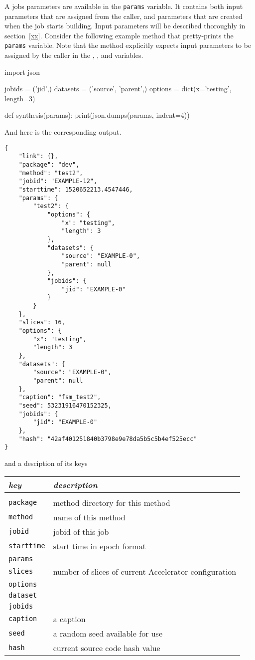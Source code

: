 A jobs parameters are available in the \texttt{params} variable.  It
contains both input parameters that are assigned from the caller, and
parameters that are created when the job starts building.  Input
parameters will be described thoroughly in section~\ref{xx}.  Consider
the following example method that pretty-prints the \texttt{params}
variable.  Note that the method explicitly expects input parameters to
be assigned by the caller in the \jobids, \datasets, and \options
variables.

\begin{python}
import json

jobids = ('jid',)
datasets = ('source', 'parent',)
options = dict(x='testing', length=3)

def synthesis(params):
    print(json.dumps(params, indent=4))
\end{python}
And here is the corresponding output.
\begin{leftbar}
\begin{verbatim}
{
    "link": {},
    "package": "dev",
    "method": "test2",
    "jobid": "EXAMPLE-12",
    "starttime": 1520652213.4547446,
    "params": {
        "test2": {
            "options": {
                "x": "testing",
                "length": 3
            },
            "datasets": {
                "source": "EXAMPLE-0",
                "parent": null
            },
            "jobids": {
                "jid": "EXAMPLE-0"
            }
        }
    },
    "slices": 16,
    "options": {
        "x": "testing",
        "length": 3
    },
    "datasets": {
        "source": "EXAMPLE-0",
        "parent": null
    },
    "caption": "fsm_test2",
    "seed": 53231916470152325,
    "jobids": {
        "jid": "EXAMPLE-0"
    },
    "hash": "42af401251840b3798e9e78da5b5c5b4ef525ecc"
}
\end{verbatim}
\end{leftbar}
and a desciption of its keys
\begin{snugshade}
\begin{tabular}{ll}
  \textsl{key} & \textsl{description}\\[2ex]\hline\\[1ex]
  \texttt{package} & method directory for this method\\
  \texttt{method} & name of this method\\
  \texttt{jobid} & jobid of this job\\
  \texttt{starttime}& start time in epoch format\\
  \texttt{params} & \\
  \texttt{slices} & number of slices of current Accelerator configuration \\
  \texttt{options} & \\
  \texttt{dataset} & \\
  \texttt{jobids} & \\
  \texttt{caption} & a caption\\
  \texttt{seed} & a random seed available for use\\
  \texttt{hash} & current source code hash value\\
\end{tabular}
\end{snugshade}



